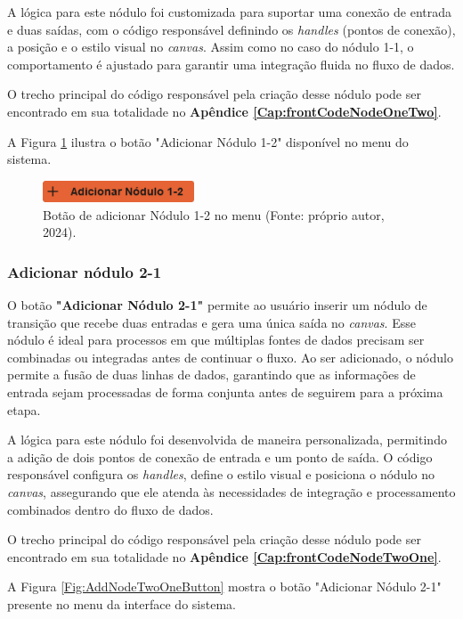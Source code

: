 A lógica para este nódulo foi customizada para suportar uma conexão de entrada e duas saídas, com o código responsável definindo os \textit{handles} (pontos de conexão), a posição e o estilo visual no \textit{canvas}. Assim como no caso do nódulo 1-1, o comportamento é ajustado para garantir uma integração fluida no fluxo de dados.

O trecho principal do código responsável pela criação desse nódulo pode ser encontrado em sua totalidade no \textbf{Apêndice \ref{Cap:frontCodeNodeOneTwo}}.

A Figura \ref{Fig:AddNodeOneTwoButton} ilustra o botão "Adicionar Nódulo 1-2" disponível no menu do sistema.

\begin{figure}[htbp]
    \centering
    \includegraphics[width=0.4\textwidth]{figuras/add-node12-button.png}
    \caption{Botão de adicionar Nódulo 1-2 no menu (Fonte: próprio autor, 2024).}
    \label{Fig:AddNodeOneTwoButton}
\end{figure}

\subsubsection{Adicionar nódulo 2-1}

O botão \textbf{"Adicionar Nódulo 2-1"} permite ao usuário inserir um nódulo de transição que recebe duas entradas e gera uma única saída no \textit{canvas}. Esse nódulo é ideal para processos em que múltiplas fontes de dados precisam ser combinadas ou integradas antes de continuar o fluxo. Ao ser adicionado, o nódulo permite a fusão de duas linhas de dados, garantindo que as informações de entrada sejam processadas de forma conjunta antes de seguirem para a próxima etapa.

A lógica para este nódulo foi desenvolvida de maneira personalizada, permitindo a adição de dois pontos de conexão de entrada e um ponto de saída. O código responsável configura os \textit{handles}, define o estilo visual e posiciona o nódulo no \textit{canvas}, assegurando que ele atenda às necessidades de integração e processamento combinados dentro do fluxo de dados.

O trecho principal do código responsável pela criação desse nódulo pode ser encontrado em sua totalidade no \textbf{Apêndice \ref{Cap:frontCodeNodeTwoOne}}.

A Figura \ref{Fig:AddNodeTwoOneButton} mostra o botão "Adicionar Nódulo 2-1" presente no menu da interface do sistema.

